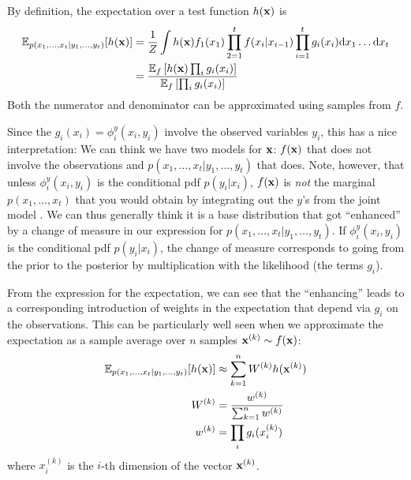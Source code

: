 \begin{exenumerate}
  \begin{solution}

    By definition, the expectation over a test function $h(\mathbf{x})$ is
    \begin{align}
      \mathbb{E}_{p(x_1, \ldots, x_t | y_1,
        \ldots, y_t)}[ h(\mathbf{x}) ] & = \frac{1}{Z} \int h(\mathbf{x}) f_1(x_1) \prod_{2=1}^t f(x_i|x_{i-1})\prod_{i=1}^t g_i(x_i) \mathrm{d} x_1 \ldots \mathrm{d} x_t\\
      & = \frac{\mathbb{E}_f \left[ h(\mathbf{x}) \prod_i g_i(x_i) \right]}{\mathbb{E}_f\left [\prod_i g_i(x_i) \right]}
    \end{align}
    Both the numerator and denominator can be approximated using
    samples from $f$.

    Since the $g_i(x_i) = \phi_i^y(x_i,y_i)$ involve the observed
    variables $y_i$, this has a nice interpretation: We can think we
    have two models for $\mathbf{x}$: $f(\mathbf{x})$ that does not involve the
    observations and $p(x_1, \ldots, x_t | y_1,\ldots, y_t)$ that
    does. Note, however, that unless $\phi_i^y(x_i, y_i)$ is the
    conditional pdf $p(y_i|x_i)$, $f(\mathbf{x})$ is \emph{not} the marginal
    $p(x_1, \ldots, x_t)$ that you would obtain by integrating out the
    $y$'s from the joint model . We can thus generally think it is a
    base distribution that got ``enhanced'' by a change of measure in our expression for
    $p(x_1, \ldots, x_t| y_1,\ldots, y_t)$. If $\phi_i^y(x_i, y_i)$ is
    the conditional pdf $p(y_i|x_i)$, the change of measure
    corresponds to going from the prior to the posterior by
    multiplication with the likelihood (the terms $g_i$).

    From the expression for the expectation, we can see that the
    ``enhancing'' leads to a corresponding introduction of weights in
    the expectation that depend via $g_i$ on the observations. This
    can be particularly well seen when we approximate the expectation as
    a sample average over $n$ samples $\mathbf{x}^{(k)} \sim f(\mathbf{x})$:
    \begin{align}
      \mathbb{E}_{p(x_1, \ldots, x_t | y_1, \ldots, y_t)}[ h(\mathbf{x}) ] & \approx \sum_{k=1}^n W^{(k)} h(\mathbf{x}^{(k)})\\
      W^{(k)} & =  \frac{w^{(k)}}{\sum_{k=1}^n  w^{(k)}}\\
      w^{(k)} & =  \prod_i g_i(x^{(k)}_i)
    \end{align}
    where $x^{(k)}_i$ is the $i$-th dimension of the vector $\mathbf{x}^{(k)}$.
  \end{solution}
  
\end{exenumerate}

